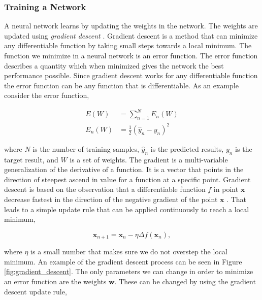\subsubsection{Training a Network} \label{subsubsec:training_a_network}

A neural network learns by updating the weights in the network. The weights are
updated using \textit{gradient descent} \citep{Bishop}. Gradient descent is
a method that can minimize any differentiable function by taking small steps
towards a local minimum. The function we minimize in a neural network is an
error function. The error function describes a quantity which when minimized
gives the network the best performance possible. Since gradient descent works
for any differentiable function the error function can be any function that is
differentiable. As an example consider the error function,

\begin{align}
    E(W)   &= \sum_{n=1}^{N} E_n(W) \\
    E_n(W) &= \frac{1}{2} \left( \hat{y}_n - y_n \right)^2
\end{align}

where $N$ is the number of training samples, $\hat{y}_n$ is the predicted
results, $y_n$ is the target result, and $W$ is a set of weights. The gradient
is a multi-variable generalization of the derivative of a function. It is a
vector that points in the direction of steepest ascend in value for a function
at a specific point. Gradient descent is based on the observation that a
differentiable function $f$ in point $\mathbf{x}$ decrease fastest in the
direction of the negative gradient of the point $\mathbf{x}$ \citep{Bishop}.
That leads to a simple update rule that can be applied continuously to reach a
local minimum,

\begin{equation}
    \mathbf{x}_{n+1} = \mathbf{x}_n - \eta \Delta f\left(\mathbf{x}_n\right),
\end{equation}

where $\eta$ is a small number that makes sure we do not overstep the local
minimum. An example of the gradient descent process can be seen in Figure
\ref{fig:gradient_descent}. The only parameters we can change in order to
minimize an error function are the weights $\mathbf{w}$. These can be changed by
using the gradient descent update rule,

